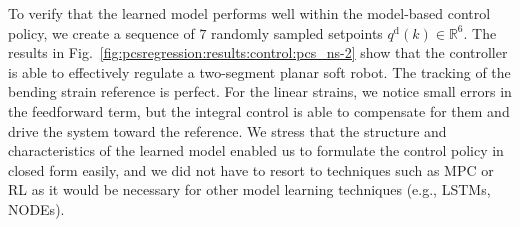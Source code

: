 To verify that the learned model performs well within the model-based control policy, we create a sequence of $7$ randomly sampled setpoints $q^\mathrm{d}(k) \in \mathbb{R}^6$. %
The results in Fig.~\ref{fig:pcsregression:results:control:pcs_ns-2} show that the controller is able to effectively regulate a two-segment planar soft robot. %
The tracking of the bending strain reference is perfect. For the linear strains, we notice small errors in the feedforward term, but the integral control is able to compensate for them and drive the system toward the reference.
We stress that the structure and characteristics of the learned model enabled us to formulate the control policy in closed form easily, and we did not have to resort to techniques such as \gls{MPC} or \gls{RL} as it would be necessary for other model learning techniques (e.g., \glspl{LSTM}, \glspl{NODE}).